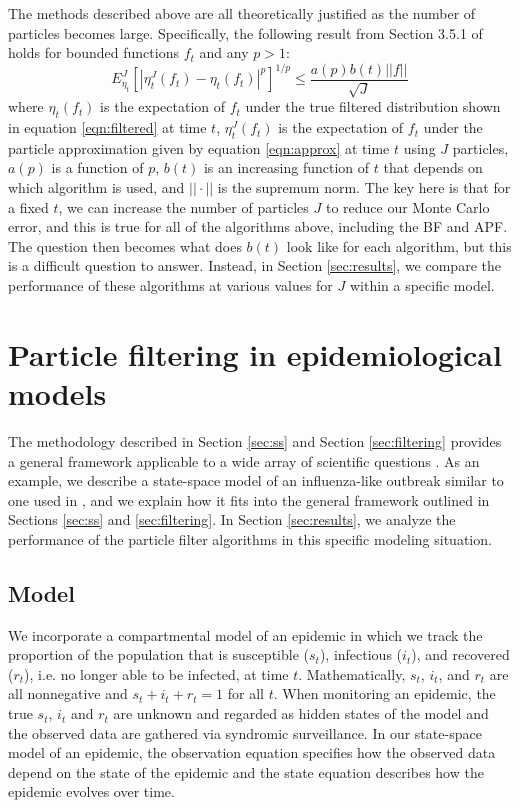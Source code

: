 \documentclass{elsarticle}
\begin{document}
The methods described above are all theoretically justified as the number of particles becomes large. Specifically, the following result from Section 3.5.1 of \cite{del2004feynman} holds for bounded functions $f_t$ and any $p>1$:
\[ E_{\eta_t}^J \left[ \left| \eta_t^J(f_t)-\eta_t(f_t)\right|^p\right]^{1/p} \le \frac{a(p) b(t) ||f||}{\sqrt{J}} \]
where $\eta_t(f_t)$ is the expectation of $f_t$ under the true filtered distribution shown in equation \eqref{eqn:filtered} at time $t$, $\eta_t^J(f_t)$ is the expectation of $f_t$ under the particle approximation given by equation \eqref{eqn:approx} at time $t$ using $J$ particles, $a(p)$ is a function of $p$, $b(t)$ is an increasing function of $t$ that depends on which algorithm is used, and $||\cdot||$ is the supremum norm. The key here is that for a fixed $t$, we can increase the number of particles $J$ to reduce our Monte Carlo error, and this is true for all of the algorithms above, including the BF and APF. The question then becomes what does $b(t)$ look like for each algorithm, but this is a difficult question to answer. Instead, in Section \ref{sec:results}, we compare the performance of these algorithms at various values for $J$ within a specific model.

\section{Particle filtering in epidemiological models \label{sec:apply}}

The methodology described in Section \ref{sec:ss} and Section \ref{sec:filtering} provides a general framework applicable to a wide array of scientific questions \citep{Carp:Clif:Fear:impr:1999, Carv:Lope:baye:2007, dukic2012tracking}. As an example, we describe a state-space model of an influenza-like outbreak similar to one used in \citet{skvortsov2012monitoring}, and we explain how it fits into the general framework outlined in Sections \ref{sec:ss} and \ref{sec:filtering}. In Section \ref{sec:results}, we analyze the performance of the particle filter algorithms in this specific modeling situation.

\subsection{Model \label{sec:model}}

We incorporate a compartmental model of an epidemic in which we track the proportion of the population that is susceptible ($s_t$), infectious ($i_t$), and recovered ($r_t$), i.e. no longer able to be infected, at time $t$. Mathematically, $s_t$, $i_t$, and $r_t$ are all nonnegative and $s_t + i_t + r_t = 1$ for all $t$. When monitoring an epidemic, the true $s_t$, $i_t$ and $r_t$ are unknown and regarded as hidden states of the model and the observed data are gathered via syndromic surveillance. In our state-space model of an epidemic, the observation equation specifies how the observed data depend on the state of the epidemic and the state equation describes how the epidemic evolves over time.
\end{document}
